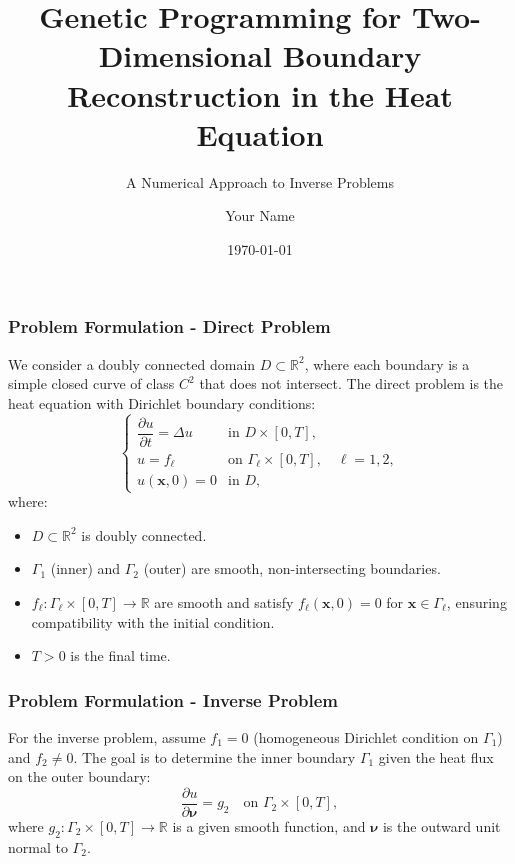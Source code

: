 \documentclass{beamer}
\title{Genetic Programming for Two-Dimensional Boundary Reconstruction in the Heat Equation}
\subtitle{A Numerical Approach to Inverse Problems}
\author{Your Name}
\date{\today}
\newcommand{\realnumbers}{\mathbb{R}}
\newcommand{\bvec}[1]{\boldsymbol{#1}} %
\begin{document}
\frame{\titlepage}

\begin{frame}
    \frametitle{Problem Formulation - Direct Problem}
    We consider a doubly connected domain \( D \subset \realnumbers^2 \), where each boundary is a simple closed curve of class \( C^2 \) that does not intersect. The direct problem is the heat equation with Dirichlet boundary conditions:
    \begin{equation}\label{eq:heat_system}
        \begin{cases}
            \dfrac{\partial u}{\partial t} = \Delta u & \text{in } D \times [0, T], \\
            u = f_\ell & \text{on } \Gamma_\ell \times [0, T], \quad \ell = 1, 2, \\
            u(\bvec{x}, 0) = 0 & \text{in } D,
        \end{cases}
    \end{equation}
    where:
    \begin{itemize}
        \item \( D \subset \realnumbers^2 \) is doubly connected.
        \item \( \Gamma_1 \) (inner) and \( \Gamma_2 \) (outer) are smooth, non-intersecting boundaries.
        \item \( f_\ell : \Gamma_\ell \times [0, T] \to \realnumbers \) are smooth and satisfy \( f_\ell(\bvec{x}, 0) = 0 \) for \( \bvec{x} \in \Gamma_\ell \), ensuring compatibility with the initial condition.
        \item \( T > 0 \) is the final time.
    \end{itemize}
\end{frame}

\begin{frame}
    \frametitle{Problem Formulation - Inverse Problem}
    For the inverse problem, assume \( f_1 = 0 \) (homogeneous Dirichlet condition on \( \Gamma_1 \)) and \( f_2 \neq 0 \). The goal is to determine the inner boundary \( \Gamma_1 \) given the heat flux on the outer boundary:
    \begin{equation}
        \dfrac{\partial u}{\partial \bvec{\nu}} = g_2 \quad \text{on } \Gamma_2 \times [0, T],
    \end{equation}
    where \( g_2 : \Gamma_2 \times [0, T] \to \realnumbers \) is a given smooth function, and \( \bvec{\nu} \) is the outward unit normal to \( \Gamma_2 \).
\end{frame}
\end{document}

